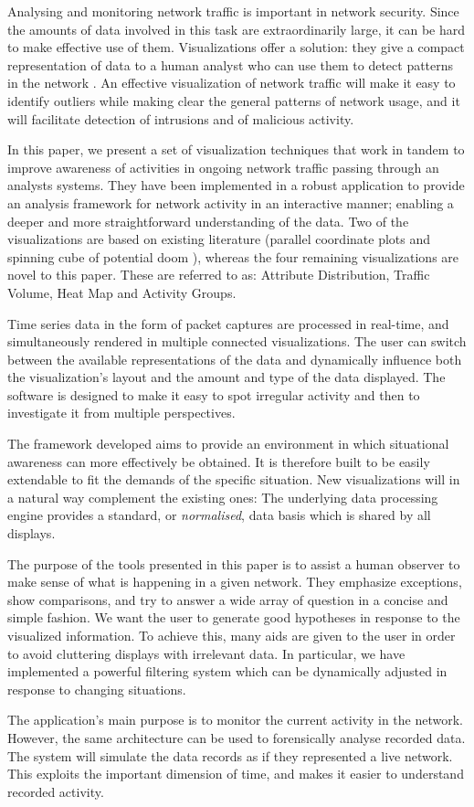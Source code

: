 Analysing and monitoring network traffic is important in network security. Since the amounts of data involved in this task are extraordinarily large, it can be hard to make effective use of them. Visualizations offer a solution: they give a compact representation of data to a human analyst who can use them to detect patterns in the network \cite{ware2012information}. An effective visualization of network traffic will make it easy to identify outliers while making clear the general patterns of network usage, and it will facilitate detection of intrusions and of malicious activity.

In this paper, we present a set of visualization techniques that work in tandem to improve awareness of activities in ongoing network traffic passing through an analysts systems. They have been implemented in a robust application to provide an analysis framework for 
network activity in an interactive manner; enabling a deeper and more straightforward understanding of the data. Two of the visualizations are based on existing literature (parallel coordinate plots \cite{inselberg1985plane} and spinning cube of potential doom \cite{cube04}), whereas the four remaining visualizations are novel to this paper. These are referred to as: Attribute Distribution, Traffic Volume, Heat Map and Activity Groups.  

Time series data in the form of packet captures are processed in real-time, and simultaneously rendered in multiple connected visualizations. The user can switch between the available representations of the data and dynamically influence both the visualization's layout and the amount and type of the data displayed. The software is designed to make it easy to spot irregular activity and then to investigate it from multiple perspectives.

The framework developed aims to provide an environment in which situational awareness can more effectively be obtained. It is therefore built to be easily extendable to fit the demands of the specific situation. New visualizations will in a natural way complement the existing ones: The underlying data processing engine provides a standard, or \textit{normalised}, data basis which is shared by all displays.

The purpose of the tools presented in this paper is to assist a human observer to make sense of what is happening in a given network. They emphasize exceptions, show comparisons, and try to answer a wide array of question in a concise and simple fashion. We want the user to generate good hypotheses in response to the visualized information. To achieve this, many aids are given to the user in order to avoid cluttering displays with irrelevant data. In particular, we have implemented a powerful filtering system which can be dynamically adjusted in response to changing situations.

The application's main purpose is to monitor the current activity in the network. However, the same architecture can be used to forensically analyse recorded data. The system will simulate the data records as if they represented a live network. This exploits the important dimension of time, and makes it easier to understand recorded activity.
